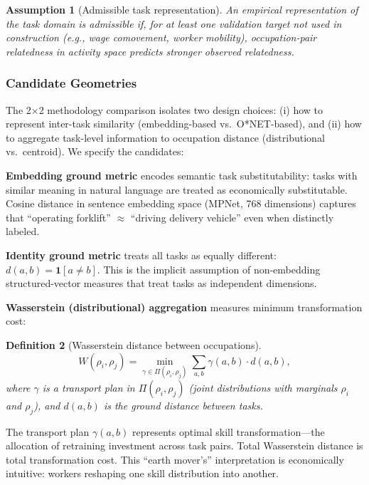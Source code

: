 \documentclass[12pt]{article}
\newtheorem{definition}{Definition}[section]
\newtheorem{assumption}[definition]{Assumption}
\begin{document}
\begin{assumption}[Admissible task representation]
\label{assump:admissible-representation}
An empirical representation of the task domain is admissible if, for at least one validation target not used in construction (e.g., wage comovement, worker mobility), occupation-pair relatedness in activity space predicts stronger observed relatedness.
\end{assumption}


\subsubsection{Candidate Geometries}


The 2$\times$2 methodology comparison isolates two design choices: (i) how to represent inter-task similarity (embedding-based vs.\ O*NET-based), and (ii) how to aggregate task-level information to occupation distance (distributional vs.\ centroid). We specify the candidates:

\textbf{Embedding ground metric} encodes semantic task substitutability: tasks with similar meaning in natural language are treated as economically substitutable. Cosine distance in sentence embedding space (MPNet, 768 dimensions) captures that ``operating forklift'' $\approx$ ``driving delivery vehicle'' even when distinctly labeled.

\textbf{Identity ground metric} treats all tasks as equally different: $d(a, b) = \mathbf{1}[a \neq b]$. This is the implicit assumption of non-embedding structured-vector measures that treat tasks as independent dimensions.

\textbf{Wasserstein (distributional) aggregation} measures minimum transformation cost:
\begin{definition}[Wasserstein distance between occupations]
\label{def:wasserstein}
\[
W(\rho_i, \rho_j) = \min_{\gamma \in \Pi(\rho_i, \rho_j)} \sum_{a,b} \gamma(a,b) \cdot d(a,b),
\]
where $\gamma$ is a transport plan in $\Pi(\rho_i, \rho_j)$ (joint distributions with marginals $\rho_i$ and $\rho_j$), and $d(a,b)$ is the ground distance between tasks.
\end{definition}

The transport plan $\gamma(a,b)$ represents optimal skill transformation---the allocation of retraining investment across task pairs. Total Wasserstein distance is total transformation cost. This ``earth mover's'' interpretation is economically intuitive: workers reshaping one skill distribution into another.
\end{document}
